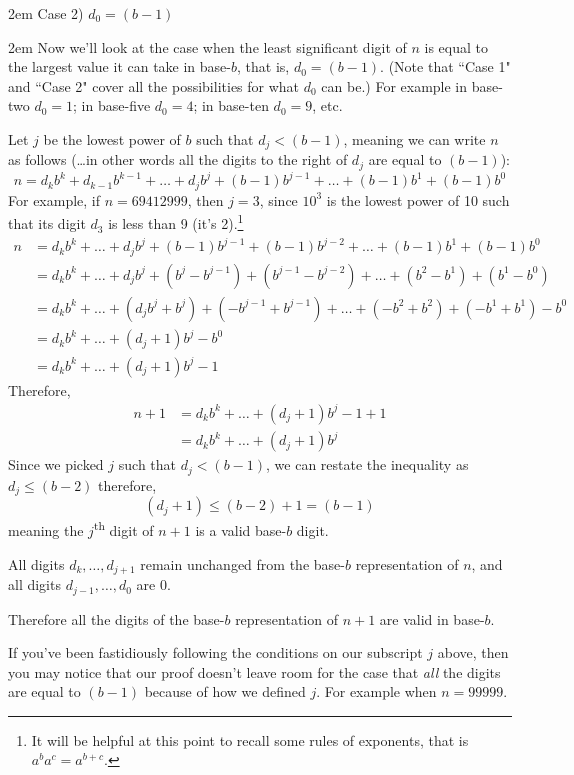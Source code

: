 \documentclass{article}
\newenvironment{jprIn}{\begin{adjustwidth}{2em}{}}{\end{adjustwidth}}
\begin{document}
\begin{jprIn}
Case 2) $d_0=(b-1)$
\begin{jprIn}
Now we'll look at the case when the least significant digit of $n$ is equal
to the largest value it can take in base-$b$, that is,
$d_0=(b-1)$.
(Note that  ``Case 1" and ``Case 2" cover all the possibilities for what $d_0$ can be.)
For example in base-two
$d_0=1$; in base-five
$d_0=4$; in base-ten $d_0=9$, etc.


Let $j$ be the lowest power of $b$ such that $d_j<(b-1)$,
meaning we can write $n$ as follows (\dots{}in other words all the digits to the right of $d_j$ are equal to $(b-1)$):
\[n = d_kb^k+d_{k-1}b^{k-1}+\dots+d_jb^j+(b-1)b^{j-1}+\dots+(b-1)b^1+(b-1)b^0\]
For example,
if $n=69412999$,
then $j=3$,
since $10^3$ is the lowest power of 10 such that its digit $d_3$ is less than 9 (it's 2).\footnote{It will
be helpful at this point to recall some rules of exponents, that is $a^ba^c=a^{b+c}$.}
\begin{align*}
n &=d_kb^k+\dots+d_jb^j+(b-1)b^{j-1}+(b-1)b^{j-2}+\dots+(b-1)b^1+(b-1)b^0\\
&= d_kb^k+\dots+d_jb^j+(b^j-b^{j-1})+(b^{j-1}-b^{j-2})+\dots+(b^2-b^1)+(b^1-b^0)\\
&= d_kb^k+\dots+(d_jb^j+b^j)+(-b^{j-1}+b^{j-1})+\dots+(-b^2+b^2)+(-b^1+b^1)-b^0\\
&= d_kb^k+\dots+(d_j+1)b^j-b^0\\
&= d_kb^k+\dots+(d_j+1)b^j-1
\end{align*}
Therefore,
\begin{align}
n+1 &=d_kb^k+\dots+(d_j+1)b^j-1+1 \nonumber \\
&= d_kb^k+\dots+(d_j+1)b^j \label{eqnA}
\end{align}
Since we picked $j$ such that $d_j<(b-1)$,
we can restate the inequality as\\
$d_j\le(b-2)$ therefore,
\[(d_j+1)\le(b-2)+1=(b-1)\]
meaning the $j$\textsuperscript{th} digit of $n+1$ is a valid base-$b$ digit.

All digits $d_k,\dots,{}d_{j+1}$ remain unchanged from the base-$b$ representation of $n$,
and all digits $d_{j-1},\dots{},d_0$ are 0.

Therefore all the digits of the base-$b$ representation of $n+1$ are valid in base-$b$.
\bigskip

If you've been fastidiously following the conditions on our subscript $j$ above, then
you may notice that
our proof doesn't leave room for the case that \emph{all} the digits are equal to $(b-1)$ because of
how we defined $j$. For example when $n=99999$.


\end{jprIn}
\end{jprIn}
\end{document}
